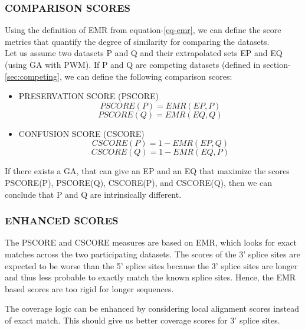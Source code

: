 \documentclass[12pt,a4paper]{article}
\begin{document}
	\subsubsection{COMPARISON SCORES} \label{scores}
	Using the definition of EMR from equation-\ref{eq-emr}, we can define the score metrics that quantify the degree of similarity for comparing the datasets.\\
	Let us assume two datasets P and Q and their extrapolated sets EP and EQ (using GA with PWM). If P and Q are competing datasets (defined in section-\ref{sec:competing}, we can define the following comparison scores:
	\begin{itemize}
		\item PRESERVATION SCORE (PSCORE)
		\begin{equation}
			PSCORE(P) = EMR(EP, P)
			\label{eq-pscore}
		\end{equation}
		\begin{equation}
			PSCORE(Q) = EMR(EQ, Q)
		\end{equation}
		\item CONFUSION SCORE (CSCORE)
		\begin{equation}
			CSCORE(P) = 1 - EMR(EP, Q)
			\label{eq-cscore}
		\end{equation}
		\begin{equation}
			CSCORE(Q) = 1 - EMR(EQ, P)
		\end{equation}
	\end{itemize}
	If there exists a GA, that can give an EP and an EQ that maximize the scores PSCORE(P), PSCORE(Q), CSCORE(P), and CSCORE(Q), then we can conclude that P and Q are intrinsically different.
	
	\subsubsection{ENHANCED SCORES} \label{score-enhanced}
	The PSCORE and CSCORE measures are based on EMR, which looks for exact matches across the two participating datasets. The scores of the 3' splice sites are expected to be worse than the 5' splice sites because the 3' splice sites are longer and thus less probable to exactly match the known splice sites. Hence, the EMR based scores are too rigid for longer sequences. \par
	The coverage logic can be enhanced by considering local alignment scores instead of exact match. This should give us better coverage scores for 3' splice sites.
		
\end{document}
